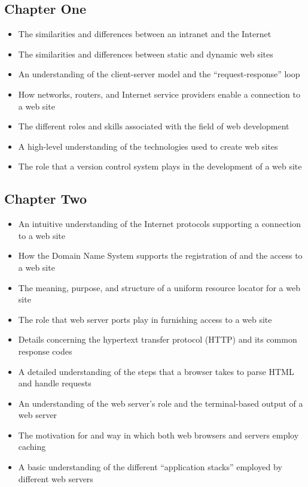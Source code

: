 \documentclass[11pt]{article}
\begin{document}
\subsection*{Chapter One}

\begin{itemize}

  \itemsep 0in

  \item The similarities and differences between an intranet and the Internet
  \item The similarities and differences between static and dynamic web sites
  \item An understanding of the client-server model and the ``request-response''
    loop
  \item How networks, routers, and Internet service providers enable a
    connection to a web site
  \item The different roles and skills associated with the field of web development
  \item A high-level understanding of the technologies used to create web sites
  \item The role that a version control system plays in the development of a web
    site

\end{itemize}

\vspace*{-.2in}
\subsection*{Chapter Two}

\begin{itemize}

  \itemsep 0in

  \item An intuitive understanding of the Internet protocols supporting a
    connection to a web site
  \item How the Domain Name System supports the registration of and the access
    to a web site
  \item The meaning, purpose, and structure of a uniform resource locator for a
    web site
  \item The role that web server ports play in furnishing access to a web site
  \item Details concerning the hypertext transfer protocol (HTTP) and its
    common response codes
  \item A detailed understanding of the steps that a browser takes to parse HTML
    and handle requests
  \item An understanding of the web server's role and the terminal-based output
    of a web server
  \item The motivation for and way in which both web browsers and servers employ
    caching
  \item A basic understanding of the different ``application stacks'' employed
    by different web servers

\end{itemize}
\end{document}
